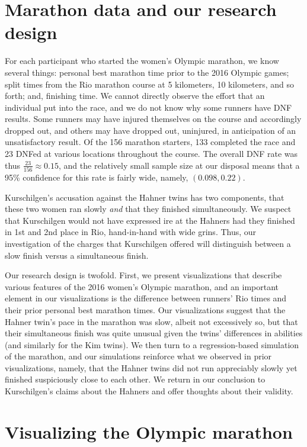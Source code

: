 \documentclass[12pt,titlepage]{article}
\begin{document}
\section*{Marathon data and our research design}

For each participant who started the women's Olympic marathon, we know
several things: personal best marathon time prior to the 2016 Olympic
games; split times from the Rio marathon course at 5 kilometers, 10
kilometers, and so forth; and, finishing time. We cannot directly
observe the effort that an individual put into the race, and we do not
know why some runners have DNF results.  Some runners may have injured
themselves on the course and accordingly dropped out, and others may
have dropped out, uninjured, in anticipation of an unsatisfactory
result. Of the 156 marathon starters, 133 completed the race and 23
DNFed at various locations throughout the course. The overall DNF rate
was thus $\frac{23}{156} \approx 0.15$, and the relatively small
sample size at our disposal means that a 95\% confidence for this rate
is fairly wide, namely, $\left(0.098, 0.22\right)$. 

Kurschilgen's accusation against the Hahner twins has two components,
that these two women ran slowly \emph{and} that they finished
simultaneously.  We suspect that Kurschilgen would not have expressed
ire at the Hahners had they finished in 1st and 2nd place in Rio,
hand-in-hand with wide grins.  Thus, our investigation of the charges
that Kurschilgen offered will distinguish between a slow finish versus
a simultaneous finish.

Our research design is twofold.  First, we present visualizations that
describe various features of the 2016 women's Olympic marathon, and an
important element in our visualizations is the difference between
runners' Rio times and their prior personal best marathon times.  Our
visualizations suggest that the Hahner twin's pace in the marathon was
slow, albeit not excessively so, but that their simultaneous finish
was quite unusual given the twins' differences in abilities (and
similarly for the Kim twins).  We then turn to a regression-based
simulation of the marathon, and our simulations reinforce what we
observed in prior visualizations, namely, that the Hahner twins did
not run appreciably slowly yet finished suspiciously close to each
other.  We return in our conclusion to Kurschilgen's claims about the
Hahners and offer thoughts about their validity.

\section*{Visualizing the Olympic marathon}
\end{document}
